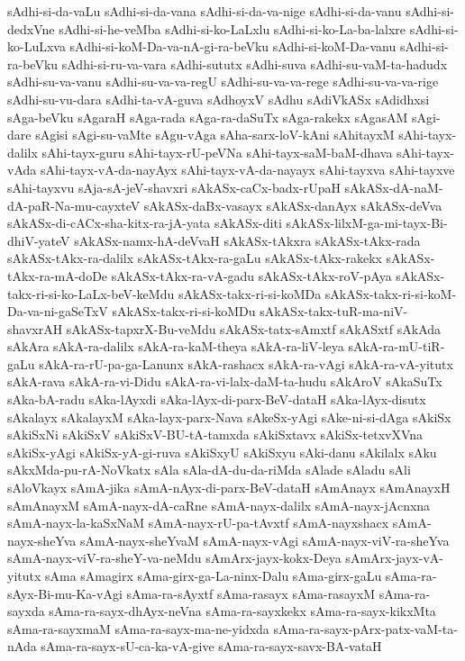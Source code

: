 {sAdhi-si-da-vaLu
sAdhi-si-da-vana
sAdhi-si-da-va-nige
sAdhi-si-da-vanu
sAdhi-si-dedxVne
sAdhi-si-he-veMba
sAdhi-si-ko-LaLxlu
sAdhi-si-ko-La-ba-lalxre
sAdhi-si-ko-LuLxva
sAdhi-si-koM-Da-va-nA-gi-ra-beVku
sAdhi-si-koM-Da-vanu
sAdhi-si-ra-beVku
sAdhi-si-ru-va-vara
sAdhi-sututx
sAdhi-suva
sAdhi-su-vaM-ta-hadudx
sAdhi-su-va-vanu
sAdhi-su-va-va-regU
sAdhi-su-va-va-rege
sAdhi-su-va-va-rige
sAdhi-su-vu-dara
sAdhi-ta-vA-guva
sAdhoyxV
sAdhu
sAdiVkASx
sAdidhxsi
sAga-beVku
sAgaraH
sAga-rada
sAga-ra-daSuTx
sAga-rakekx
sAgasAM
sAgi-dare
sAgisi
sAgi-su-vaMte
sAgu-vAga
sAha-sarx-loV-kAni
sAhitayxM
sAhi-tayx-dalilx
sAhi-tayx-guru
sAhi-tayx-rU-peVNa
sAhi-tayx-saM-baM-dhava
sAhi-tayx-vAda
sAhi-tayx-vA-da-nayAyx
sAhi-tayx-vA-da-nayayx
sAhi-tayxva
sAhi-tayxve
sAhi-tayxvu
sAja-sA-jeV-shavxri
sAkASx-caCx-badx-rUpaH
sAkASx-dA-naM-dA-paR-Na-mu-cayxteV
sAkASx-daBx-vasayx
sAkASx-danAyx
sAkASx-deVva
sAkASx-di-cACx-sha-kitx-ra-jA-yata
sAkASx-diti
sAkASx-lilxM-ga-mi-tayx-Bi-dhiV-yateV
sAkASx-namx-hA-deVvaH
sAkASx-tAkxra
sAkASx-tAkx-rada
sAkASx-tAkx-ra-dalilx
sAkASx-tAkx-ra-gaLu
sAkASx-tAkx-rakekx
sAkASx-tAkx-ra-mA-doDe
sAkASx-tAkx-ra-vA-gadu
sAkASx-tAkx-roV-pAya
sAkASx-takx-ri-si-ko-LaLx-beV-keMdu
sAkASx-takx-ri-si-koMDa
sAkASx-takx-ri-si-koM-Da-va-ni-gaSeTxV
sAkASx-takx-ri-si-koMDu
sAkASx-takx-tuR-ma-niV-shavxrAH
sAkASx-tapxrX-Bu-veMdu
sAkASx-tatx-sAmxtf
sAkASxtf
sAkAda
sAkAra
sAkA-ra-dalilx
sAkA-ra-kaM-theya
sAkA-ra-liV-leya
sAkA-ra-mU-tiR-gaLu
sAkA-ra-rU-pa-ga-Lanunx
sAkA-rashacx
sAkA-ra-vAgi
sAkA-ra-vA-yitutx
sAkA-rava
sAkA-ra-vi-Didu
sAkA-ra-vi-lalx-daM-ta-hudu
sAkAroV
sAkaSuTx
sAka-bA-radu
sAka-lAyxdi
sAka-lAyx-di-parx-BeV-dataH
sAka-lAyx-disutx
sAkalayx
sAkalayxM
sAka-layx-parx-Nava
sAkeSx-yAgi
sAke-ni-si-dAga
sAkiSx
sAkiSxNi
sAkiSxV
sAkiSxV-BU-tA-tamxda
sAkiSxtavx
sAkiSx-tetxvXVna
sAkiSx-yAgi
sAkiSx-yA-gi-ruva
sAkiSxyU
sAkiSxyu
sAki-danu
sAkilalx
sAku
sAkxMda-pu-rA-NoVkatx
sAla
sAla-dA-du-da-riMda
sAlade
sAladu
sAli
sAloVkayx
sAmA-jika
sAmA-nAyx-di-parx-BeV-dataH
sAmAnayx
sAmAnayxH
sAmAnayxM
sAmA-nayx-dA-caRne
sAmA-nayx-dalilx
sAmA-nayx-jAcnxna
sAmA-nayx-la-kaSxNaM
sAmA-nayx-rU-pa-tAvxtf
sAmA-nayxshacx
sAmA-nayx-sheYva
sAmA-nayx-sheYvaM
sAmA-nayx-vAgi
sAmA-nayx-viV-ra-sheYva
sAmA-nayx-viV-ra-sheY-va-neMdu
sAmArx-jayx-kokx-Deya
sAmArx-jayx-vA-yitutx
sAma
sAmagirx
sAma-girx-ga-La-ninx-Dalu
sAma-girx-gaLu
sAma-ra-sAyx-Bi-mu-Ka-vAgi
sAma-ra-sAyxtf
sAma-rasayx
sAma-rasayxM
sAma-ra-sayxda
sAma-ra-sayx-dhAyx-neVna
sAma-ra-sayxkekx
sAma-ra-sayx-kikxMta
sAma-ra-sayxmaM
sAma-ra-sayx-ma-ne-yidxda
sAma-ra-sayx-pArx-patx-vaM-ta-nAda
sAma-ra-sayx-sU-ca-ka-vA-give
sAma-ra-sayx-savx-BA-vataH
}
